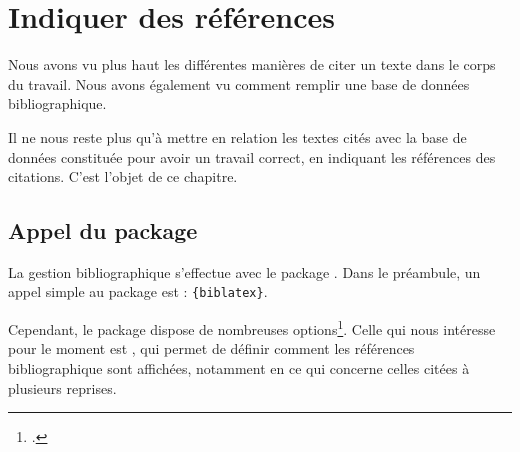 \chapter{Indiquer des références}



\begin{prealable}
Nous avons vu plus haut les différentes manières de citer un texte dans  le corps du travail. Nous avons également vu comment remplir une base de données bibliographique.

Il ne nous reste plus qu'à mettre en relation les textes cités avec la base de données constituée pour avoir un travail correct, en indiquant les références des citations. C'est l'objet de ce chapitre.

\end{prealable}


\section[Appel du package]{Appel du package }

La gestion bibliographique s'effectue avec le package . Dans le préambule, un appel simple au package est :
\verb|{biblatex}|.


Cependant, le package dispose de nombreuses options\footcite{biblatex_options}. Celle qui nous intéresse pour le moment est , qui permet de définir comment les références bibliographique sont affichées, notamment en ce qui concerne celles citées à plusieurs reprises.

